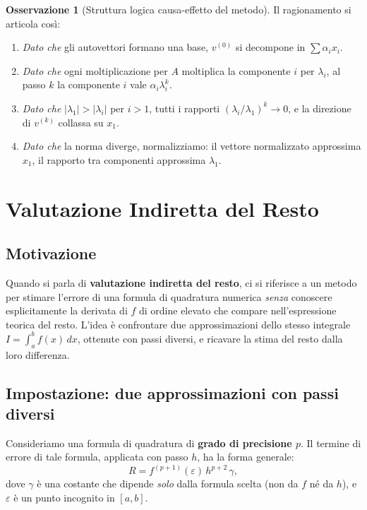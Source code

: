 \documentclass[a4paper,12pt]{article}
\theoremstyle{definition}
\newtheorem{osservazione}{Osservazione}[section]
\theoremstyle{remark}
\begin{document}
\begin{osservazione}[Struttura logica causa-effetto del metodo]
Il ragionamento si articola così:
\begin{enumerate}
  \item \emph{Dato che} gli autovettori formano una base, $v^{(0)}$ si decompone in
        $\sum \alpha_i x_i$.
  \item \emph{Dato che} ogni moltiplicazione per $A$ moltiplica la componente $i$ per
        $\lambda_i$, al passo $k$ la componente $i$ vale $\alpha_i \lambda_i^k$.
  \item \emph{Dato che} $|\lambda_1| > |\lambda_i|$ per $i > 1$, tutti i rapporti
        $(\lambda_i/\lambda_1)^k \to 0$, e la direzione di $v^{(k)}$ collassa su $x_1$.
  \item \emph{Dato che} la norma diverge, normalizziamo: il vettore normalizzato approssima
        $x_1$, il rapporto tra componenti approssima $\lambda_1$.
\end{enumerate}
\end{osservazione}


\section{Valutazione Indiretta del Resto}

\subsection{Motivazione}

Quando si parla di \textbf{valutazione indiretta del resto}, ci si riferisce
a un metodo per stimare l'errore di una formula di quadratura numerica
\emph{senza} conoscere esplicitamente la derivata di $f$ di ordine elevato
che compare nell'espressione teorica del resto. L'idea è confrontare due
approssimazioni dello stesso integrale $I = \int_a^b f(x)\,dx$, ottenute
con passi diversi, e ricavare la stima del resto dalla loro differenza.

\subsection{Impostazione: due approssimazioni con passi diversi}

Consideriamo una formula di quadratura di \textbf{grado di precisione $p$}.
Il termine di errore di tale formula, applicata con passo $h$, ha la forma
generale:
\[
  R = f^{(p+1)}(\varepsilon)\,h^{p+2}\,\gamma,
\]
dove $\gamma$ è una costante che dipende \emph{solo} dalla formula scelta
(non da $f$ né da $h$), e $\varepsilon$ è un punto incognito in $[a,b]$.
\end{document}
